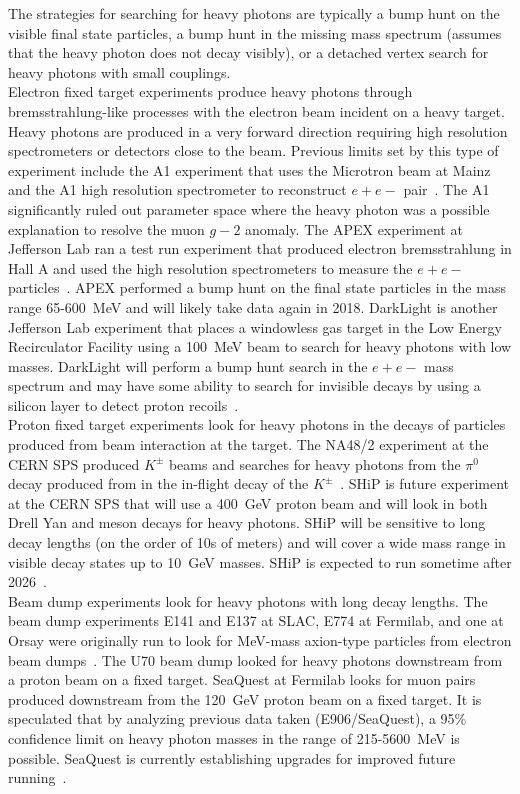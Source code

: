 The strategies for searching for heavy photons are typically a bump hunt on the visible final state particles, a bump hunt in the missing mass spectrum (assumes that the heavy photon does not decay visibly), or a detached vertex search for heavy photons with small couplings. \\
\indent Electron fixed target experiments produce heavy photons through bremsstrahlung-like processes with the electron beam incident on a heavy target. Heavy photons are produced in a very forward direction requiring high resolution spectrometers or detectors close to the beam. Previous limits set by this type of experiment include the A1 experiment that uses the Microtron beam at Mainz and the A1 high resolution spectrometer to reconstruct $e+e-$ pair~\cite{beranek_theoretical_2013}. The A1 significantly ruled out parameter space where the heavy photon was a possible explanation to resolve the muon $g-2$ anomaly. The APEX experiment at Jefferson Lab ran a test run experiment that produced electron bremsstrahlung in Hall A and used the high resolution spectrometers to measure the $e+e-$ particles~\cite{abrahamyan_search_2011}. APEX performed a bump hunt on the final state particles in the mass range 65-600~MeV and will likely take data again in 2018. DarkLight is another Jefferson Lab experiment that places a windowless gas target in the Low Energy Recirculator Facility using a 100~MeV beam to search for heavy photons with low masses. DarkLight will perform a bump hunt search in the $e+e-$ mass spectrum and may have some ability to search for invisible decays by using a silicon layer to detect proton recoils~\cite{alewski_darklight_2014}.\\
\indent Proton fixed target experiments look for heavy photons in the decays of particles produced from beam interaction at the target. The NA48/2 experiment at the CERN SPS produced $K^{\pm}$ beams and searches for heavy photons from the $\pi^0$ decay produced from in the in-flight decay of the $K^{\pm}$~\cite{Batley_2015lha}. SHiP is future experiment at the CERN SPS that will use a 400~GeV proton beam and will look in both Drell Yan and meson decays for heavy photons. SHiP will be sensitive to long decay lengths (on the order of 10s of meters) and will cover a wide mass range in visible decay states up to 10~GeV masses. SHiP is expected to run sometime after 2026~\cite{ship_collaboration_facility_2015}.\\
\indent Beam dump experiments look for heavy photons with long decay lengths. The beam dump experiments E141 and E137 at SLAC, E774 at Fermilab, and one at Orsay were originally run to look for MeV-mass axion-type particles from electron beam dumps~\cite{alexander_dark_2016}. The U70 beam dump looked for heavy photons downstream from a proton beam on a fixed target. SeaQuest at Fermilab looks for muon pairs produced downstream from the 120~GeV proton beam on a fixed target. It is speculated that by analyzing previous data taken (E906/SeaQuest), a 95$\%$ confidence limit on heavy photon masses in the range of 215-5600~MeV is possible. SeaQuest is currently establishing upgrades for improved future running~\cite{gardner_new_2016}.
